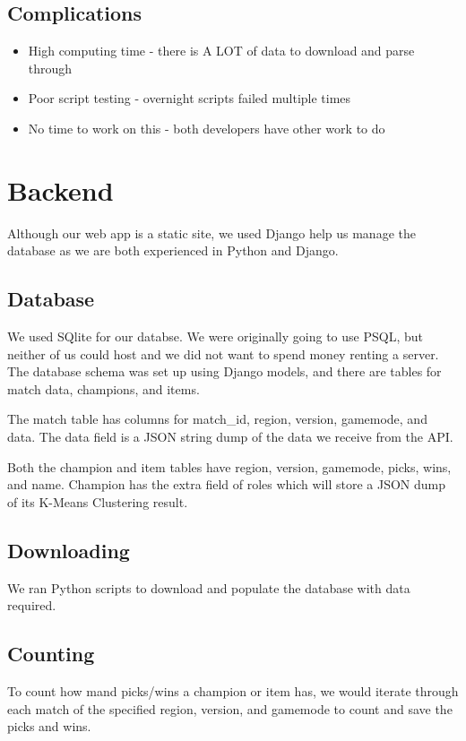 \documentclass{article}
\begin{document}
\subsection{Complications}
\begin{itemize}
    \item High computing time - there is A LOT of data to download and parse through
    \item Poor script testing - overnight scripts failed multiple times
    \item No time to work on this - both developers have other work to do
\end{itemize}


\section{Backend}
Although our web app is a static site, we used Django help us manage the database as we are both experienced in Python and Django.

\subsection{Database}
We used SQlite for our databse. We were originally going to use PSQL, but neither of us could host and we did not want to spend money renting a server. The database schema was set up using Django models, and there are tables for match data, champions, and items. 

The match table has columns for match\_id, region, version, gamemode, and data. The data field is a JSON string dump of the data we receive from the API. 

Both the champion and item tables have region, version, gamemode, picks, wins, and name. Champion has the extra field of roles which will store a JSON dump of its K-Means Clustering result.

\subsection{Downloading}
We ran Python scripts to download and populate the database with data required.

\subsection{Counting}
To count how mand picks/wins a champion or item has, we would iterate through each match of the specified region, version, and gamemode to count and save the picks and wins.
\end{document}

